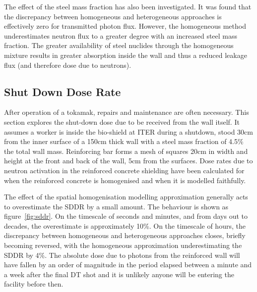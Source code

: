 The effect of the steel mass fraction has also been investigated. It was found that the discrepancy between homogeneous and heterogeneous approaches is effectively zero for transmitted photon flux. However, the homogeneous method underestimates neutron flux to a greater degree with an increased steel mass fraction. The greater availability of steel nuclides through the homogeneous mixture results in greater absorption inside the wall and thus a reduced leakage flux (and therefore dose due to neutrons).


\FloatBarrier
\subsection{Shut Down Dose Rate}
\label{subsec:sddr}
After operation of a tokamak, repairs and maintenance are often necessary. This section explores the shut-down dose due to be received from the wall itself. It assumes a worker is inside the bio-shield at ITER during a shutdown, stood 30cm from the inner surface of a 150cm thick wall with a steel mass fraction of 4.5\% the total wall mass. Reinforcing bar forms a mesh of squares 20cm in width and height at the front and back of the wall, 5cm from the surfaces. Dose rates due to neutron activation in the reinforced concrete shielding have been calculated for when the reinforced concrete is homogenised and when it is modelled faithfully.

The effect of the spatial homogenisation modelling approximation generally acts to overestimate the SDDR by a small amount. The behaviour is shown as figure~\ref{fig:sddr}. On the timescale of seconds and minutes, and from days out to decades, the overestimate is approximately 10\%. On the timescale of hours, the discrepancy between homogeneous and heterogeneous approaches closes, briefly becoming reversed, with the homogeneous approximation underestimating the SDDR by 4\%. The absolute dose due to photons from the reinforced wall will have fallen by an order of magnitude in the period elapsed between a minute and a week after the final DT shot and it is unlikely anyone will be entering the facility before then.

